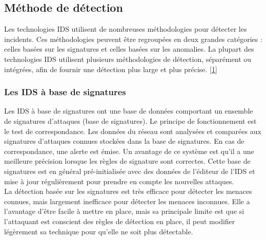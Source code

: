 \newpage

\subsection{Méthode de détection }

\vspace{1em}

Les technologies IDS utilisent de nombreuses méthodologies pour détecter les incidents. Ces méthodologies peuvent être regroupées en deux grandes catégories : celles basées sur les signatures et celles basées sur les anomalies.  La plupart des technologies IDS utilisent plusieurs méthodologies de détection, séparément ou intégrées, afin de fournir une détection plus large et plus précise. \hyperref[biblio]{[1]}

\subsubsection{Les IDS à base de signatures}
\label{chap2:IDSsignature}

\vspace{0.5em}

Les IDS à base de signatures ont une base de données comportant un ensemble de signatures d’attaques (base de signatures). Le principe de fonctionnement est le test de correspondance. Les données du réseau sont analysées et comparées aux signatures d’attaques connues stockées dans la base de signatures. En cas de correspondance, une alerte est émise. Un avantage de ce système est qu’il a une meilleure précision lorsque les règles de signature sont correctes. Cette base de signatures est en général pré-initialisée avec des données de l’éditeur de l’IDS et mise à jour régulièrement pour prendre en compte les nouvelles attaques.\\

La détection basée sur les signatures est très efficace pour détecter les menaces connues, mais largement inefficace pour détecter les menaces inconnues. Elle a l'avantage d'être facile à mettre en place, mais sa principale limite est que si l'attaquant est conscient des règles de détection en place, il peut modifier légèrement sa technique pour qu'elle ne soit plus détectable.\\

